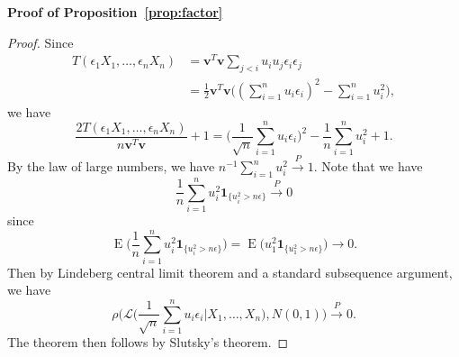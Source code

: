 \documentclass[review]{elsarticle}
\DeclareMathOperator{\myE}{E}
\newcommand{\Bv}{\mathbf{v}}
\theoremstyle{plain}
\theoremstyle{definition}
\theoremstyle{remark}
\begin{document}
\textbf{Proof of Proposition~\ref{prop:factor}}
\begin{proof}
    Since
\begin{equation*}
    \begin{aligned}
        T(\epsilon_1 X_1,\ldots,\epsilon_n X_n)&=\Bv^T \Bv\sum_{j<i}  u_i u_j \epsilon_i \epsilon_j\\
        &=\frac{1}{2}\Bv^T \Bv\big( (\sum_{i=1}^n u_i \epsilon_i )^2-\sum_{i=1}^n u_i^2\big),
    \end{aligned}
\end{equation*}
we have
    \begin{equation*}
\frac{2T(\epsilon_1 X_1,\ldots,\epsilon_n X_n)}{n\Bv^T \Bv}+1=
         \big(\frac{1}{\sqrt{n}}\sum_{i=1}^n u_i \epsilon_i \big)^2-\frac{1}{n}\sum_{i=1}^n u_i^2+ 1.
    \end{equation*}
    By the law of large numbers, we have $n^{-1}\sum_{i=1}^n u_i^2\xrightarrow{P} 1$.
    Note that we have
    \begin{equation*}
        \frac{1}{n} \sum_{i=1}^n u_i^2\mathbf{1}_{\{u_i^2>n\epsilon\}}\xrightarrow{P}0
    \end{equation*}
    since
    \begin{equation*}
        \myE\Big(\frac{1}{n} \sum_{i=1}^n u_i^2\mathbf{1}_{\{u_i^2>n\epsilon\}}\Big)
        =
        \myE \big( u_1^2\mathbf{1}_{\{u_1^2>n\epsilon\}}\big)\to 0.
    \end{equation*}
    Then by Lindeberg central limit theorem and a standard subsequence argument, we have
    \begin{equation*}
        \rho\Big(\mathcal{L}\big(\frac{1}{\sqrt{n}}\sum_{i=1}^n u_i \epsilon_i \big|X_1,\ldots,X_n\big),N(0,1)\Big)\xrightarrow{P}0.
    \end{equation*}
The theorem then follows by Slutsky's theorem.

\end{proof}






\end{document}
